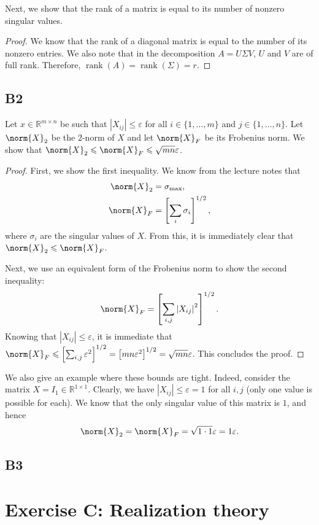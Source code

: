 \documentclass[11pt]{article}
\newcommand{\abs}[1]{\left\lvert#1\right\lvert}
\DeclareMathOperator{\rank}{rank}
\newcommand{\real}{\mathbb{R}} %
\newcommand{\snorm}[1]{\norm{#1}_2} %
\newcommand{\fnorm}[1]{\norm{#1}_F} %
\begin{document}
Next, we show that the rank of a matrix is equal to its number of nonzero singular values.
\begin{proof}
	We know that the rank of a diagonal matrix is equal to the number of its nonzero entries.
	We also note that in the decomposition \(A = U \Sigma V\), \(U\) and \(V\) are of full rank.
	Therefore, \(\rank(A) = \rank(\Sigma) = r\).
\end{proof}

\subsection*{B2}
Let \(x \in \real^{m \times n}\) be such that \(\abs{X_{ij}} \leqslant \varepsilon\) for all \(i \in \{1, \dots, m\}\) and \(j \in \{1, \dots, n\}\).
Let \(\snorm{X}\) be the \(2\)-norm of \(X\) and let \(\fnorm{X}\) be its Frobenius norm.
We show that \(\snorm{X} \leqslant \fnorm{X} \leqslant \sqrt{mn} \varepsilon\).
\begin{proof}
	First, we show the first inequality.
	We know from the lecture notes that
	\begin{align*}
	\snorm{X} &= \sigma_{\textnormal{max}},\\
	\fnorm{X} &= \left[\sum_i \sigma_i\right]^{1/2},
	\end{align*}
	where \(\sigma_i\) are the singular values of \(X\).
	From this, it is immediately clear that \(\snorm{X} \leqslant \fnorm{X}\).
	
	Next, we use an equivalent form of the Frobenius norm to show the second inequality:
	\[
	\fnorm{X} = \left[\sum_{i, j} \abs{X_{ij}}^2 \right]^{1/2}.
	\]
	Knowing that \(\abs{X_{ij}} \leqslant \varepsilon\), it is immediate that \(\fnorm{X} \leqslant \left[\sum_{i, j} \varepsilon^2\right]^{1/2} = \left[mn \varepsilon^2\right]^{1/2} = \sqrt{mn} \varepsilon\).
	This concludes the proof.
\end{proof}

We also give an example where these bounds are tight.
Indeed, consider the matrix \(X = I_1 \in \real^{1 \times 1}\).
Clearly, we have \(\abs{X_{ij}} \leqslant \varepsilon = 1\) for all \(i, j\) (only one value is possible for each).
We know that the only singular value of this matrix is \(1\), and hence
\[
\snorm{X} = \fnorm{X} = \sqrt{1 \cdot 1} \varepsilon = 1 \varepsilon.
\]
\subsection*{B3}

\section*{Exercise C: Realization theory}
\end{document}
